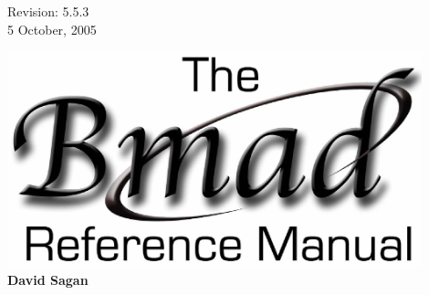 \thispagestyle{empty}

\begin{flushright}
\large
  Revision: 5.5.3 \\
  5 October, 2005 \\
\end{flushright}

\vfill

{
\begin{center}
\includegraphics[width=12cm]{bmad_ref_manual.eps} \\
\vskip 0.3in
\huge\bf David Sagan
\end{center}
}

\vfill
\break